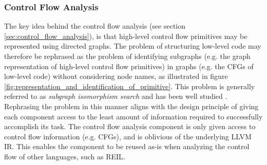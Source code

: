 
\subsubsection{Control Flow Analysis}
\label{sec:design_control_flow_analysis}

The key idea behind the control flow analysis (see section \ref{sec:control_flow_analysis}), is that high-level control flow primitives may be represented using directed graphs. The problem of structuring low-level code may therefore be rephrased as the problem of identifying subgraphs (e.g. the graph representation of high-level control flow primitives) in graphs (e.g. the CFGs of low-level code) without considering node names, as illustrated in figure \ref{fig:representation_and_identification_of_primitive}. This problem is generally referred to as \textit{subgraph isomorphism search} and has been well studied \cite{subgraph_isomorphism_algorithms}. Rephrasing the problem in this manner aligns with the design principle of giving each component access to the least amount of information required to successfully accomplish its task. The control flow analysis component is only given access to control flow information (e.g. CFGs), and is oblivious of the underlying LLVM IR. This enables the component to be reused as-is when analyzing the control flow of other languages, such as REIL.


